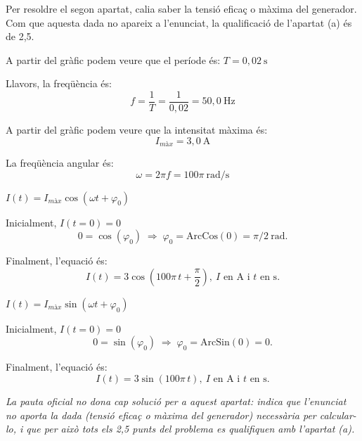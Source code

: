 Per resoldre el segon apartat, calia saber la tensió eficaç o màxima del generador. Com que aquesta dada no apareix a l'enunciat, la qualificació de l'apartat (a) és de 2,5.

\begin{solapartat}
 A partir del gràfic podem veure que el període és: $T = 0,02\ \mathrm{s}$

 Llavors, la freqüència és:
\[ f = \frac{1}{T} = \frac{1}{0,02} = 50,0\ \mathrm{Hz} \]

 A partir del gràfic podem veure que la intensitat màxima és:
\[ I_\textit{màx} = 3,0\ \mathrm{A} \]

 La freqüència angular és:
\[ \omega = 2\pi f = 100\pi\ \mathrm{rad/s} \]


 $I(t) = I_\textit{màx}\cos(\omega t + \varphi_0)$

 Inicialment, $I(t = 0) = 0$
\[ 0 = \cos(\varphi_0) \;\Rightarrow\; \varphi_0 = \mathrm{ArcCos}(0) = \pi/2\ \mathrm{rad}. \]

 Finalment, l'equació és:
\[ I(t) = 3\cos\left(100\pi\,t + \frac{\pi}{2}\right),\ I \text{ en A i } t \text{ en s}. \]


 $I(t) = I_\textit{màx}\sin(\omega t + \varphi_0)$

 Inicialment, $I(t = 0) = 0$
\[ 0 = \sin(\varphi_0) \;\Rightarrow\; \varphi_0 = \mathrm{ArcSin}(0) = 0. \]

 Finalment, l'equació és:
\[ I(t) = 3\sin(100\pi\,t),\ I \text{ en A i } t \text{ en s}. \]
\end{solapartat}

\begin{solapartat}
\textit{La pauta oficial no dona cap solució per a aquest apartat: indica que l'enunciat no aporta la dada (tensió eficaç o màxima del generador) necessària per calcular-lo, i que per això tots els 2,5 punts del problema es qualifiquen amb l'apartat (a).}
\end{solapartat}
